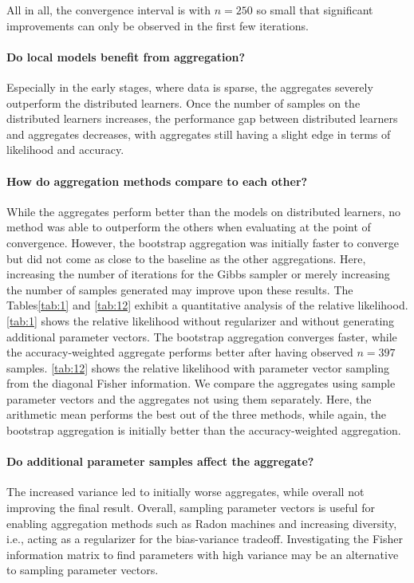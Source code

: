 All in all, the convergence interval is with $n=250$ so small that significant improvements can only be observed in the first few iterations.

\paragraph*{Do local models benefit from aggregation?}
Especially in the early stages, where data is sparse, the aggregates severely outperform the distributed learners.
Once the number of samples on the distributed learners increases, the performance gap between distributed learners and aggregates decreases, with aggregates still having a slight edge in terms of likelihood and accuracy.

\paragraph*{How do aggregation methods compare to each other?}
While the aggregates perform better than the models on distributed learners, no method was able to outperform the others when evaluating at the point of convergence.
However, the bootstrap aggregation was initially faster to converge but did not come as close to the baseline as the other aggregations.
Here, increasing the number of iterations for the Gibbs sampler or merely increasing the number of samples generated may improve upon these results.
The Tables\ref{tab:1} and \ref{tab:12} exhibit a quantitative analysis of the relative likelihood.
\autoref{tab:1} shows the relative likelihood without regularizer and without generating additional parameter vectors.
The bootstrap aggregation converges faster, while the accuracy-weighted aggregate performs better after having observed $n=397$ samples.
\autoref{tab:12} shows the relative likelihood with parameter vector sampling from the diagonal Fisher information. 
We compare the aggregates using sample parameter vectors and the aggregates not using them separately.
Here, the arithmetic mean performs the best out of the three methods, while again, the bootstrap aggregation is initially better than the accuracy-weighted aggregation.


\paragraph*{Do additional parameter samples affect the aggregate?}
The increased variance led to initially worse aggregates, while overall not improving the final result.
Overall, sampling parameter vectors is useful for enabling aggregation methods such as Radon machines and increasing diversity, i.e., acting as a regularizer for the bias-variance tradeoff.
Investigating the Fisher information matrix to find parameters with high variance may be an alternative to sampling parameter vectors.

